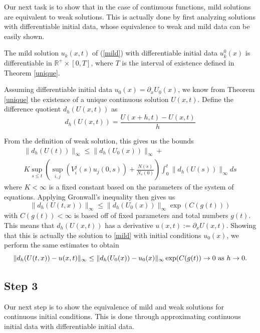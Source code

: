 Our next task is to show that in the case of continuous functions, mild solutions are equivalent to weak solutions.  This is actually done by first analyzing solutions with differentiable initial data, whose equivalence to weak and mild data can be easily shown. 

\begin{theorem}\label{diffsol}
The mild solution $u_k(x,t)$ of (\ref{mild}) with differentiable initial data $u_k^0(x)$ is differentiable in $\mathbb R^+ \times [0,T]$, where $T$ is the interval of existence defined in Theorem \ref{unique}. 
\end{theorem}


Assuming differentiable initial data $u_0(x) = \partial_x U_0(x)$, we know from Theorem \ref{unique} the existence of a unique continuous solution $U(x,t)$.  Define the difference quotient $d_h(U(x,t))$ as
\begin{equation}  
d_h(U(x,t)) = \frac{U(x+h,t)-U(x,t)}{h} 
\end{equation}

From the definition of weak solution, this gives us the bounds
\begin{eqnarray}
\|d_h(U(t))\|_\infty\le \|d_h(U_0(x))\|_\infty+\\K\sup_{s\le t}(\sup_{i,j}(V_i^j(s)u_{j}(0,s))+\frac{N(s)}{N_s(0)})
\int_0^t\|d_h(U(s))\|_\infty ds
\end{eqnarray}
where $K<\infty$ is a fixed constant based on the parameters of the system of equations.
Applying Gronwall's inequality then gives us
\begin{equation}
\|d_h(U(t,x))\|_\infty\le \|d_h(U_0(x))\|_\infty\exp(C(g(t)))
\end{equation}
with $C(g(t))<\infty$ is based off of fixed parameters and total numbers $g(t)$.  This means that $d_h(U(x,t))$ has a derivative $u(x,t):=\partial_x U(x,t)$.  Showing that this is actually the solution to \ref{mild} with initial conditions $u_0(x)$, we perform the same estimates  to obtain
\begin{equation}
\| d_{h}(U(t,x))-u(x,t)\|_\infty \le \|d_h(U_0(x))-u_0(x)\|_\infty \exp(C(g(t)) \rightarrow 0 \hbox{ as }h\rightarrow 0.
\end{equation}

\subsection*{Step 3}  Our next step is to show the equivalence of mild and weak solutions for continuous initial conditions.  This is done through approximating continuous initial data with differentiable initial data.  

